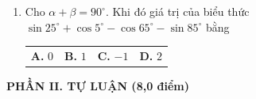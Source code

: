 \documentclass[12pt,a4paper]{article}
\begin{document}
\begin{enumerate}[label=\textbf{Câu \arabic*.}, leftmargin=*, itemsep=3.5pt, parsep=0pt]
  \item Cho $\alpha + \beta = 90^\circ$. Khi đó giá trị của biểu thức $\sin 25^\circ + \cos 5^\circ - \cos 65^\circ - \sin 85^\circ$ bằng
  \begin{flushleft}
    \begin{tabularx}{\linewidth}{X X X X}
      \textbf{A.} $0$ & 
      \textbf{B.} $1$ & 
      \textbf{C.} $-1$ & 
      \textbf{D.} $2$
    \end{tabularx}
  \end{flushleft}
\end{enumerate}

\newpage

\noindent\textbf{\large PHẦN II. TỰ LUẬN (8,0 điểm)}
\end{document}
